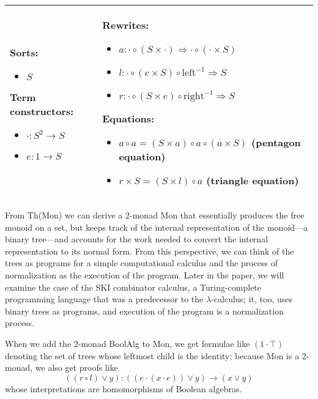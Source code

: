 \documentclass{llncs}
\newcommand{\maps}{\colon}
\newcommand{\leftu}{\mathrm{left}}
\newcommand{\rightu}{\mathrm{right}}
\begin{document}
\begin{center}
  \begin{tabular}{|p{0.3\linewidth}|p{0.7\linewidth}|}
    \hline
    Sorts:
    \begin{itemize}
      \item $S$
    \end{itemize}
    Term constructors:
    \begin{itemize}
      \item $\cdot\maps S^2 \to S$
      \item $e\maps 1 \to S$
    \end{itemize}
    &
    Rewrites:
    \begin{itemize}
      \item $a\maps \cdot \circ (S \times \cdot) \Rightarrow \cdot \circ (\cdot \times S)$
      \item $l\maps \cdot \circ (e \times S) \circ \leftu^{-1} \Rightarrow S$
      \item $r\maps \cdot \circ (S \times e) \circ \rightu^{-1} \Rightarrow S$
    \end{itemize}
    Equations:
    \begin{itemize}
      \item $a \circ a = (S \times a) \circ a \circ (a \times S)$ (pentagon equation)
      \item $r \times S = (S \times l) \circ a$ (triangle equation)
    \end{itemize}\\
    \hline
  \end{tabular}
\end{center}
From Th(Mon) we can derive a 2-monad Mon that essentially produces the free monoid on a set, but keeps track of the internal representation of the monoid---a binary tree---and accounts for the work needed to convert the internal representation to its normal form.  From this perspective, we can think of the trees as programs for a simple computational calculus and the process of normalization as the execution of the program.  Later in the paper, we will examine the case of the SKI combinator calculus, a Turing-complete programming language that was a predecessor to the $\lambda$-calculus; it, too, uses binary trees as programs, and execution of the program is a normalization process.

When we add the 2-monad BoolAlg to Mon, we get formulae like $(1 \cdot \top)$ denoting the set of trees whose leftmost child is the identity; because Mon is a 2-monad, we also get proofs like 
\[ ((r \circ l) \lor y)\maps ((e \cdot (x \cdot e)) \lor y) \to (x \lor y) \]
whose interpretations are homomorphisms of Boolean algebras.
\end{document}
